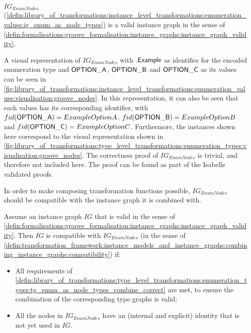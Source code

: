 \begin{thm}
\label{defin:library_of_transformations:instance_level_transformations:enumeration_values:ig_enum_as_node_types_correct}
$IG_{EnumNodes}$ (\cref{defin:library_of_transformations:instance_level_transformations:enumeration_values:ig_enum_as_node_types}) is a valid instance graph in the sense of \cref{defin:formalisations:groove_formalisation:instance_graphs:instance_graph_validity}.
\end{thm}

A visual representation of $IG_{EnumNodes}$ with $.\mathsf{Example}$ as identifier for the encoded enumeration type and $\mathsf{OPTION\_A}$, $\mathsf{OPTION\_B}$ and $\mathsf{OPTION\_C}$ as its values can be seen in \cref{fig:library_of_transformations:instance_level_transformations:enumeration_values:visualisation:groove_nodes}. In this representation, it can also be seen that each values has its corresponding identifier, with $fid(\mathsf{OPTION\_A}) = ExampleOptionA$, $fid(\mathsf{OPTION\_B}) = ExampleOptionB$ and $fid(\mathsf{OPTION\_C}) = ExampleOptionC$. Furthermore, the instances shown here correspond to the visual representation shown in \cref{fig:library_of_transformations:type_level_transformations:enumeration_types:visualisation:groove_nodes}. The correctness proof of $IG_{EnumNodes}$ is trivial, and therefore not included here. The proof can be found as part of the Isabelle validated proofs.

In order to make composing transformation functions possible, $IG_{EnumNodes}$ should be compatible with the instance graph it is combined with.

\begin{thm}
\label{defin:library_of_transformations:instance_level_transformations:enumeration_values:ig_enum_as_node_types_combine_correct}
Assume an instance graph $IG$ that is valid in the sense of \cref{defin:formalisations:groove_formalisation:instance_graphs:instance_graph_validity}. Then $IG$ is compatible with $IG_{EnumNodes}$ (in the sense of \cref{defin:transformation_framework:instance_models_and_instance_graphs:combining_instance_graphs:compatibility}) if:
\begin{itemize}
    \item All requirements of \cref{defin:library_of_transformations:type_level_transformations:enumeration_types:tg_enum_as_node_types_combine_correct} are met, to ensure the combination of the corresponding type graphs is valid;
    \item All the nodes in $IG_{EnumNodes}$ have an (internal and explicit) identity that is not yet used in $IG$.
\end{itemize}
\end{thm}

